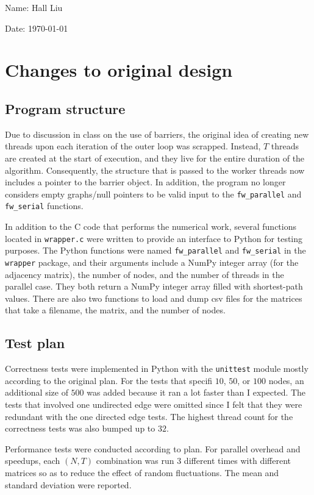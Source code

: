 \documentclass{article}
\begin{document}
Name: Hall Liu

Date: \today 
\vspace{20pt}

\section*{Changes to original design}
\subsection*{Program structure}
Due to discussion in class on the use of barriers, the original idea of creating new threads upon each iteration of the outer loop was scrapped. Instead, $T$ threads are created at the start of execution, and they live for the entire duration of the algorithm. Consequently, the structure that is passed to the worker threads now includes a pointer to the barrier object. In addition, the program no longer considers empty graphs/null pointers to be valid input to the \verb|fw_parallel| and \verb|fw_serial| functions.

In addition to the C code that performs the numerical work, several functions located in \verb|wrapper.c| were written to provide an interface to Python for testing purposes. The Python functions were named \verb|fw_parallel| and \verb|fw_serial| in the \verb|wrapper| package, and their arguments include a NumPy integer array (for the adjacency matrix), the number of nodes, and the number of threads in the parallel case. They both return a NumPy integer array filled with shortest-path values. There are also two functions to load and dump csv files for the matrices that take a filename, the matrix, and the number of nodes.
\subsection*{Test plan}
Correctness tests were implemented in Python with the \verb|unittest| module mostly according to the original plan. For the tests that specifi $10$, $50$, or $100$ nodes, an additional size of $500$ was added because it ran a lot faster than I expected. The tests that involved one undirected edge were omitted since I felt that they were redundant with the one directed edge tests. The highest thread count for the correctness tests was also bumped up to $32$. 

Performance tests were conducted according to plan. For parallel overhead and speedups, each $(N,T)$ combination was run 3 different times with different matrices so as to reduce the effect of random fluctuations. The mean and standard deviation were reported. 
\end{document}
